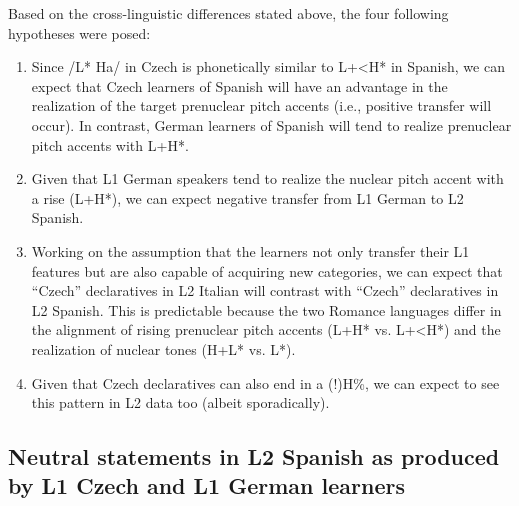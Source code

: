 Based on the cross-linguistic differences stated above, the four following hypotheses were posed:

\begin{enumerate}[label=H\arabic*,font=\PeskovaColonAfterItem]
\item\label{neutral-h1}
 Since /L* Ha/ in Czech is phonetically similar to L+<H* in Spanish, we can expect that Czech learners of Spanish will have an advantage in the realization of the target prenuclear pitch accents (i.e., positive transfer will occur). In contrast, German learners of Spanish will tend to realize prenuclear pitch accents with L+H*.

\item\label{neutral-h2}
 Given that L1 German speakers tend to realize the nuclear pitch accent with a rise (L+H*), we can expect negative transfer from L1 German to L2 Spanish.

\item\label{neutral-h3}
 Working on the assumption that the learners not only transfer their L1 features but are also capable of acquiring new categories, we can expect that “Czech” declaratives in L2 Italian will contrast with “Czech” declaratives in L2 Spanish. This is predictable because the two Romance languages differ in the alignment of rising prenuclear pitch accents (L+H* vs. L+<H*) and the realization of nuclear tones (H+L* vs. L*).

\item\label{neutral-h4}
 Given that Czech declaratives can also end in a (!)H\%, we can expect to see this pattern in L2 data too (albeit sporadically).

\end{enumerate}

\subsection{Neutral statements in L2 Spanish as produced by L1 Czech and L1 German learners}\label{sec:4.1.2}

